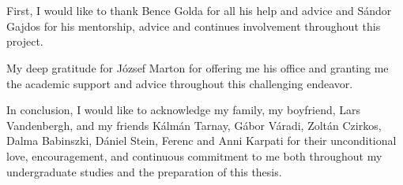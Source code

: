\chapter*{\koszonetnyilvanitas}


First, I would like to thank  Bence Golda for all his help and advice and Sándor Gajdos for his mentorship, advice and continues involvement throughout this project. 

My deep  gratitude  for József Marton for offering me his office and granting me the academic support and advice throughout this challenging endeavor.  

In conclusion, I would like to acknowledge my family, my boyfriend, Lars Vandenbergh, and my friends Kálmán Tarnay, Gábor Váradi, Zoltán Czirkos, Dalma Babinszki, Dániel Stein, Ferenc and Anni  Karpati for their unconditional love, encouragement, and continuous  commitment to me both throughout my undergraduate studies  and the preparation of this thesis.